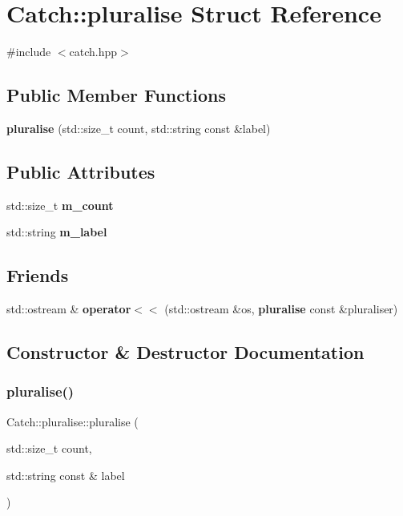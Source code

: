 \section{Catch\+:\+:pluralise Struct Reference}
\label{struct_catch_1_1pluralise}


{\ttfamily \#include $<$catch.\+hpp$>$}

\subsection*{Public Member Functions}
\begin{DoxyCompactItemize}
\item 
\textbf{ pluralise} (std\+::size\+\_\+t count, std\+::string const \&label)
\end{DoxyCompactItemize}
\subsection*{Public Attributes}
\begin{DoxyCompactItemize}
\item 
std\+::size\+\_\+t \textbf{ m\+\_\+count}
\item 
std\+::string \textbf{ m\+\_\+label}
\end{DoxyCompactItemize}
\subsection*{Friends}
\begin{DoxyCompactItemize}
\item 
std\+::ostream \& \textbf{ operator$<$$<$} (std\+::ostream \&os, \textbf{ pluralise} const \&pluraliser)
\end{DoxyCompactItemize}


\subsection{Constructor \& Destructor Documentation}
\mbox{\label{struct_catch_1_1pluralise_a5c55e22de2416cfe416edf715c6b9234}} 
\subsubsection{pluralise()}
{\footnotesize\ttfamily Catch\+::pluralise\+::pluralise (\begin{DoxyParamCaption}\item[{std\+::size\+\_\+t}]{count,  }\item[{std\+::string const \&}]{label }\end{DoxyParamCaption})}



